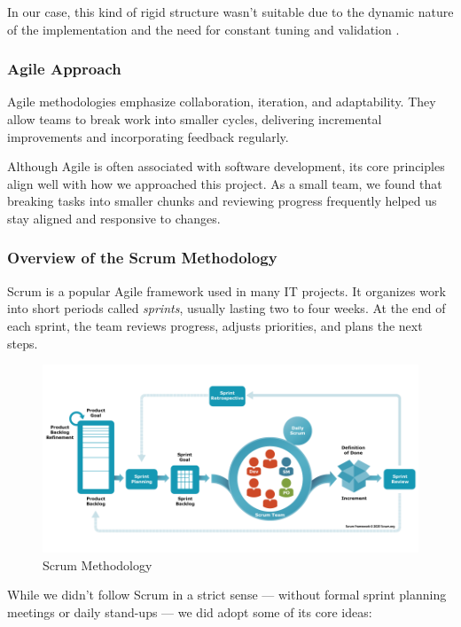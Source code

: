 \documentclass[12pt,english]{report}
\begin{document}
In our case, this kind of rigid structure wasn’t suitable due to the dynamic nature of the implementation and the need for constant tuning and validation \cite{ref5}.

\subsubsection{Agile Approach}

Agile methodologies emphasize collaboration, iteration, and adaptability. They allow teams to break work into smaller cycles, delivering incremental improvements and incorporating feedback regularly.

Although Agile is often associated with software development, its core principles align well with how we approached this project. As a small team, we found that breaking tasks into smaller chunks and reviewing progress frequently helped us stay aligned and responsive to changes\cite{ref6}.

\subsubsection{Overview of the Scrum Methodology}

Scrum is a popular Agile framework used in many IT projects. It organizes work into short periods called \emph{sprints}, usually lasting two to four weeks. At the end of each sprint, the team reviews progress, adjusts priorities, and plans the next steps.

\begin{figure}[H]
    \centering
    \includegraphics[width= 1\textwidth]{chapter1/scrum.png}
    \caption{Scrum Methodology \cite{ref7}}
    \label{fig: Scrum Methodology}
\end{figure}

While we didn't follow Scrum in a strict sense — without formal sprint planning meetings or daily stand-ups — we did adopt some of its core ideas:
\end{document}
